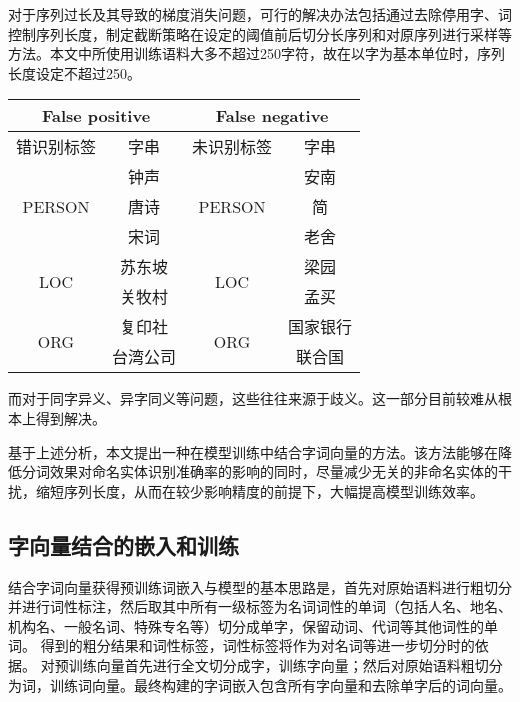 对于序列过长及其导致的梯度消失问题，可行的解决办法包括通过去除停用字、词控制序列长度，制定截断策略在设定的阈值前后切分长序列和对原序列进行采样等方法。本文中所使用训练语料大多不超过250字符，故在以字为基本单位时，序列长度设定不超过250。

\begin{table}[H]
    \centering
    \begin{tabular}{cccc}
        \toprule
        \multicolumn{2}{c}{False positive} & \multicolumn{2}{c}{False negative}\\
        \midrule
        错识别标签 & 字串 & 未识别标签 & 字串\\
        \cmidrule(lr){1-2}\cmidrule(lr){3-4}
        \multirow{3}{*}{PERSON} & 钟声 & \multirow{3}{*}{PERSON} & 安南 \\
        & 唐诗 & & 简 \\
        & 宋词 & & 老舍\\
        \cmidrule(lr){1-2}\cmidrule(lr){3-4}
        \multirow{2}{*}{LOC} & 苏东坡 & \multirow{2}{*}{LOC}& 梁园\\
        & 关牧村 & & 孟买 \\
        \cmidrule(lr){1-2}\cmidrule(lr){3-4}
        \multirow{2}{*}{ORG} & 复印社 & \multirow{2}{*}{ORG}& 国家银行\\
        & 台湾公司 & & 联合国\\
        \bottomrule
    \end{tabular}
    \label{tab:fp_fn_word}
\end{table}
而对于同字异义、异字同义等问题，这些往往来源于歧义。这一部分目前较难从根本上得到解决。

基于上述分析，本文提出一种在模型训练中结合字词向量的方法。该方法能够在降低分词效果对命名实体识别准确率的影响的同时，尽量减少无关的非命名实体的干扰，缩短序列长度，从而在较少影响精度的前提下，大幅提高模型训练效率。
\subsection{字向量结合的嵌入和训练}
\label{subsec:combine_word_char}
结合字词向量获得预训练词嵌入与模型的基本思路是，首先对原始语料进行粗切分并进行词性标注，然后取其中所有一级标签为名词词性的单词（包括人名、地名、机构名、一般名词、特殊专名等）切分成单字，保留动词、代词等其他词性的单词。
得到的粗分结果和词性标签，词性标签将作为对名词等进一步切分时的依据。
对预训练向量首先进行全文切分成字，训练字向量；然后对原始语料粗切分为词，训练词向量。最终构建的字词嵌入包含所有字向量和去除单字后的词向量。


